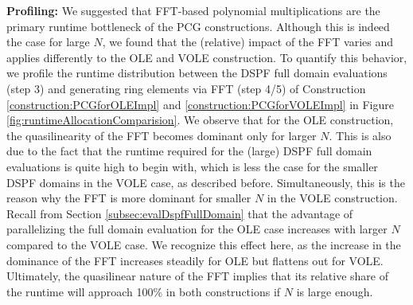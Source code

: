 \textbf{Profiling:} We suggested that FFT-based polynomial multiplications are the primary runtime bottleneck of the PCG constructions. Although this is indeed the case for large $N$, we found that the (relative) impact of the FFT varies and applies differently to the OLE and VOLE construction. To quantify this behavior, we profile the runtime distribution between the DSPF full domain evaluations (step 3) and generating ring elements via FFT (step 4/5) of Construction \ref{construction:PCGforOLEImpl} and \ref{construction:PCGforVOLEImpl} in Figure \ref{fig:runtimeAllocationComparision}. We observe that for the OLE construction, the quasilinearity of the FFT becomes dominant only for larger $N$. This is also due to the fact that the runtime required for the (large) DSPF full domain evaluations is quite high to begin with, which is less the case for the smaller DSPF domains in the VOLE case, as described before. Simultaneously, this is the reason why the FFT is more dominant for smaller $N$ in the VOLE construction. Recall from Section \ref{subsec:evalDspfFullDomain} that the advantage of parallelizing the full domain evaluation for the OLE case increases with larger $N$ compared to the VOLE case. We recognize this effect here, as the increase in the dominance of the FFT increases steadily for OLE but flattens out for VOLE. Ultimately, the quasilinear nature of the FFT implies that its relative share of the runtime will approach 100\% in both constructions if $N$ is large enough.

